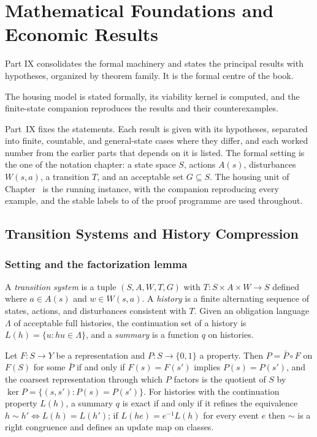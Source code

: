 \part{Mathematical Foundations and Economic Results}
\label{part:IX}

Part IX consolidates the formal machinery and states the principal results with hypotheses, organized by theorem family. It is the formal centre of the book.

\begin{housing}The housing model is stated formally, its viability kernel is computed, and the finite-state companion reproduces the results and their counterexamples.\end{housing}


Part~IX fixes the statements. Each result is given with its hypotheses, separated into finite, countable, and general-state cases where they differ, and each worked number from the earlier parts that depends on it is listed. The formal setting is the one of the notation chapter: a state space $S$, actions $A(s)$, disturbances $W(s,a)$, a transition $T$, and an acceptable set $G\subseteq S$. The housing unit of Chapter~ is the running instance, with the companion reproducing every example, and the stable labels  to  of the proof programme are used throughout.

\chapter{Transition Systems and History Compression}\label{ch:41}

\section{Setting and the factorization lemma}

A \emph{transition system} is a tuple $(S,A,W,T,G)$ with $T:S\times A\times W\to S$ defined where $a\in A(s)$ and $w\in W(s,a)$. A \emph{history} is a finite alternating sequence of states, actions, and disturbances consistent with $T$. Given an obligation language $\Lambda$ of acceptable full histories, the continuation set of a history is $L(h)=\{u:hu\in\Lambda\}$, and a \emph{summary} is a function $q$ on histories.

\begin{theorem}\label{thm:factor}
Let $F:S\to Y$ be a representation and $P:S\to\{0,1\}$ a property. Then $P=\bar P\circ F$ on $F(S)$ for some $\bar P$ if and only if $F(s)=F(s')$ implies $P(s)=P(s')$, and the coarsest representation through which $P$ factors is the quotient of $S$ by $\ker P=\{(s,s'):P(s)=P(s')\}$. For histories with the continuation property $L(h)$, a summary $q$ is exact if and only if it refines the equivalence $h\sim h'\Leftrightarrow L(h)=L(h')$; if $L(he)=e^{-1}L(h)$ for every event $e$ then $\sim$ is a right congruence and defines an update map on classes.
\end{theorem}

